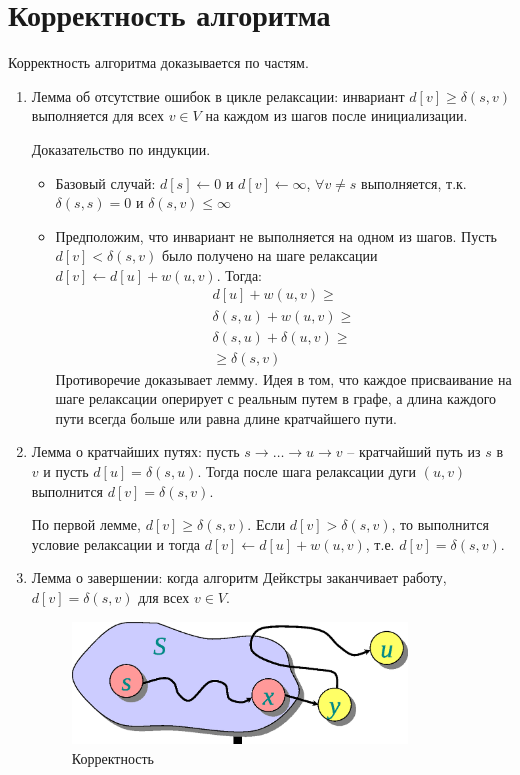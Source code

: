 \documentclass[11pt]{article}
\begin{document}
\section{Корректность алгоритма}
Корректность алгоритма доказывается по частям.
\begin{enumerate}
\item Лемма об отсутствие ошибок в цикле релаксации: инвариант $d[v] \geqslant \delta(s, v)$ выполняется для всех $v \in V$ на каждом из шагов после инициализации.

Доказательство по индукции.
\begin{itemize}
\item Базовый случай: $d[s] \leftarrow 0$ и $d[v] \leftarrow \infty$, $\forall v \neq s$
  выполняется, т.к. $\delta(s, s) = 0$ и $\delta(s, v) \leqslant \infty$
\item Предположим, что инвариант не выполняется на одном из шагов. Пусть $d[v] < \delta(s, v)$ было получено на шаге релаксации $d[v] \leftarrow d[u] + w(u, v)$. Тогда:
  \begin{align*}
    d[u] + w(u, v) \geqslant \\
    \delta(s, u) + w(u, v) \geqslant \\
    \delta(s, u) + \delta(u, v) \geqslant \\
    \geqslant \delta(s, v)
  \end{align*}
Противоречие доказывает лемму. Идея в том, что каждое присваивание на шаге релаксации оперирует с реальным путем в графе, а длина каждого пути всегда больше или равна длине кратчайшего пути.
\end{itemize}
\item Лемма о кратчайших путях: пусть $s \to \ldots \to u \to v$ -- кратчайший путь из $s$ в $v$ и пусть $d[u] = \delta(s, u)$. Тогда после шага релаксации дуги $(u, v)$ выполнится $d[v] = \delta(s, v)$.

По первой лемме, $d[v] \geqslant \delta(s, v)$. Если $d[v] > \delta(s, v)$, то выполнится условие релаксации и тогда $d[v] \leftarrow d[u] + w(u, v)$, т.е. $d[v] = \delta(s, v)$.
\item Лемма о завершении: когда алгоритм Дейкстры заканчивает работу, $d[v] = \delta(s, v)$ для всех $v \in V$.
\begin{figure}[h!]
  \centering
  \includegraphics[width=3.5in]{lecture17/correctness.eps}
  \caption{Корректность}
\end{figure}
\end{enumerate}
\end{document}
